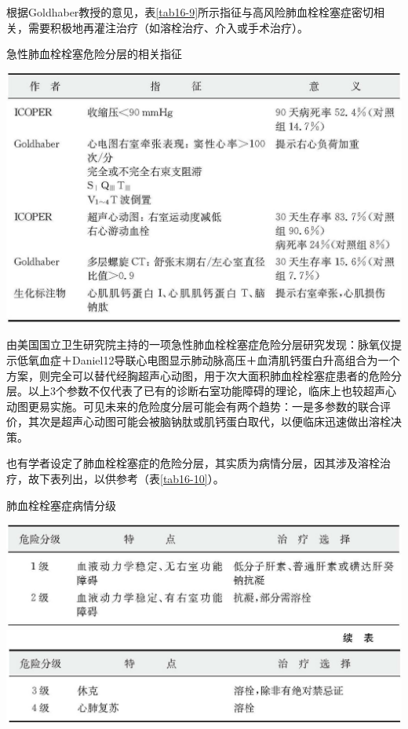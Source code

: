 根据Goldhaber教授的意见，表\ref{tab16-9}所示指征与高风险肺血栓栓塞症密切相关，需要积极地再灌注治疗（如溶栓治疗、介入或手术治疗）。

\begin{table}[htbp]
\centering
\caption{急性肺血栓栓塞危险分层的相关指征}
\label{tab16-9}
\includegraphics{./images/Image00128.jpg}
\end{table}

由美国国立卫生研究院主持的一项急性肺血栓栓塞症危险分层研究发现：脉氧仪提示低氧血症＋Daniel12导联心电图显示肺动脉高压＋血清肌钙蛋白升高组合为一个方案，则完全可以替代经胸超声心动图，用于次大面积肺血栓栓塞症患者的危险分层。以上3个参数不仅代表了已有的诊断右室功能障碍的理论，临床上也较超声心动图更易实施。可见未来的危险度分层可能会有两个趋势：一是多参数的联合评价，其次是超声心动图可能会被脑钠肽或肌钙蛋白取代，以便临床迅速做出溶栓决策。

也有学者设定了肺血栓栓塞症的危险分层，其实质为病情分层，因其涉及溶栓治疗，故下表列出，以供参考（表\ref{tab16-10}）。

\begin{table}[htbp]
\centering
\caption{肺血栓栓塞症病情分级}
\label{tab16-10}
\includegraphics{./images/Image00129.jpg}
\includegraphics{./images/Image00130.jpg}
\end{table}



